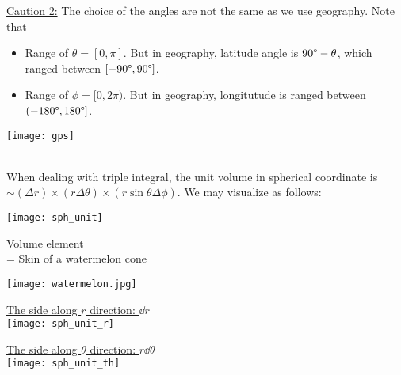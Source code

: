 \documentclass[class=article, crop=false, 12pt]{standalone}
\begin{document}
\ul{Caution 2:} The choice of the angles are not the same as we use geography. Note that\\

\begin{minipage}{0.7\textwidth}
    \begin{itemize}
        \item Range of $\theta = [0,\pi]$. But in geography, 
        latitude angle is $90\degree-\theta$, which ranged between $[-90\degree, 90\degree]$.

        \item Range of $\phi = [0, 2\pi)$. But in geography, 
        longitutude is ranged between $(-180\degree, 180\degree]$.
        
    \end{itemize}
\end{minipage}
%
\begin{minipage}{0.28\textwidth}
    \centering
    \texttt{[image: gps]}
\end{minipage}

\hfill\\[1em]
When dealing with triple integral, 
the unit volume in spherical coordinate is $\sim (\Delta r)\times(r\Delta \theta)\times(r\sin\theta\Delta \phi)$.
We may visualize as follows:

\begin{center}
    \begin{minipage}{0.3\textwidth}
        \centering
        \texttt{[image: sph\_unit]}
    \end{minipage}
    \begin{minipage}{0.3\textwidth}
        \centering
        Volume element\\
        = Skin of a watermelon cone
    \end{minipage}
    \begin{minipage}{0.3\textwidth}
        \centering
        \texttt{[image: watermelon.jpg]}
    \end{minipage}
\end{center}

\begin{center}
    \begin{minipage}{0.4\textwidth}
        \centering
        \ul{The side along $r$ direction: $\dd{r}$}\\[0.5em]
        \texttt{[image: sph\_unit\_r]}
    \end{minipage}
    \begin{minipage}{0.4\textwidth}
        \centering
        \ul{The side along $\theta$ direction: $r\dd{\theta}$}\\[0.5em]
        \texttt{[image: sph\_unit\_th]}
    \end{minipage}
\end{center}
\end{document}
